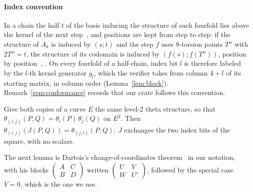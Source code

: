 \documentclass[version=preprint]{iacrcc}
\begin{document}
    \paragraph{Index convention}
    In a chain the half $t$ of the basis inducing the structure of each
    fourfold lies above the kernel of the next step~\cite[Section 4.1]{Dar24},
    and positions are kept from step to step: if the structure of $A_k$ is
    induced by $(s; t)$ and the step $f$ uses 8-torsion points $T''$ with
    $2T'' = t$, the structure of its codomain is induced by $(f(s); f(T''))$,
    position by position~\cite[Theorem 56]{DLRW24}, \cite[Section
    4.2]{Dar24}. On every fourfold of a half-chain, index bit $l$ is therefore
    labeled by the $l$-th kernel generator $g_l$, which the verifier takes
    from column $4 + l$ of its starting matrix, in column order
    (Lemma~\ref{lem:block}). Remark~\ref{rem:conformance} records that our
    crate follows this convention.

    \begin{lemma}
        \label{lem:product}
        Give both copies of a curve $E$ the same level-2 theta structure, so that
        $\theta_{(i,j)}(P, Q) = \theta_i(P)\,\theta_j(Q)$ on $E^2$. Then
        $\theta_{(i,j)}(J(P, Q)) = \theta_{(j,i)}(P, Q)$: $J$ exchanges the two
        index bits of the square, with no scalars.
    \end{lemma}


    The next lemma is Dartois's change-of-coordinates
    theorem~\cite[Theorem 12]{Dar24} in our notation, with his blocks
    $\left(\begin{smallmatrix} A & C \\ B & D \end{smallmatrix}\right)$
    written $\left(\begin{smallmatrix} U & V \\ W & U' \end{smallmatrix}\right)$,
    followed by the special case $V = 0$, which is the one we use.
\end{document}
